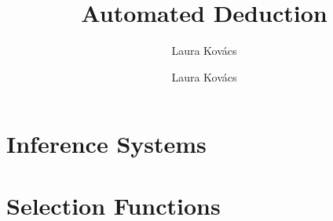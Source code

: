 \documentclass[10pt]{beamer}
\author{
  \textcolor{red!90!black}{Laura Kov\'acs}}
\title{
              	       Automated Deduction
}
\author{
  \textcolor{red!90!black}{Laura Kov\'acs} \\
\titlegraphic{\hspace*{1em}\texttt{[image: forsyte]}}}
\begin{document}
\date{}
\frame{\titlepage}



\section{Inference Systems}



\section{Selection Functions}


%
\end{document}
